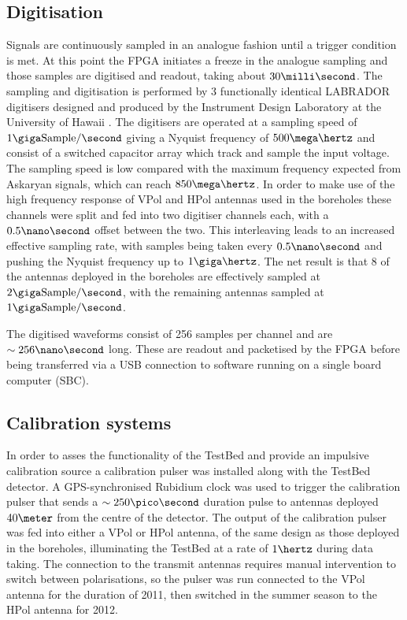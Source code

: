 \subsection{Digitisation}
\label{sec:ara-detector:TestBed:Digitisation}

Signals are continuously sampled in an analogue fashion until a trigger condition is met. At this point the FPGA initiates a freeze in the analogue sampling and those samples are digitised and readout, taking about $30 \milli \second$. The sampling and digitisation is performed by 3 functionally identical LABRADOR digitisers designed and produced by the Instrument Design Laboratory at the University of Hawaii \cite{Varner2007447}. The digitisers are operated at a sampling speed of $1 \giga \mbox{Sample} /\second$ giving a Nyquist frequency of $500 \mega \hertz$ and consist of a switched capacitor array which track and sample the input voltage. The sampling speed is low compared with the maximum frequency expected from Askaryan signals, which can reach $850 \mega \hertz$. In order to make use of the high frequency response of VPol and HPol antennas used in the boreholes these channels were split and fed into two digitiser channels each, with a $0.5 \nano \second$ offset between the two. This interleaving leads to an increased effective sampling rate, with samples being taken every $0.5 \nano \second$ and pushing the Nyquist frequency up to $1 \giga \hertz$. The net result is that 8 of the antennas deployed in the boreholes are effectively sampled at $2 \giga \mbox{Sample} /\second$, with the remaining antennas sampled at $1 \giga \mbox{Sample} /\second$.

The digitised waveforms consist of 256 samples per channel and are $\sim 256 \nano \second$ long. These are readout and packetised by the FPGA before being transferred via a USB connection to software running on a single board computer (SBC).

\subsection{Calibration systems}
\label{sec:ara-detector:TestBed:Calibration-systems}

In order to asses the functionality of the TestBed and provide an impulsive calibration source a calibration pulser was installed along with the TestBed detector. A GPS-synchronised Rubidium clock was used to trigger the calibration pulser that sends a $\sim 250 \pico \second$ duration pulse to antennas deployed $40 \meter$ from the centre of the detector. The output of the calibration pulser was fed into either a VPol or HPol antenna, of the same design as those deployed in the boreholes, illuminating the TestBed at a rate of $1 \hertz$ during data taking. The connection to the transmit antennas requires manual intervention to switch between polarisations, so the pulser was run connected to the VPol antenna for the duration of 2011, then switched in the summer season to the HPol antenna for 2012.



